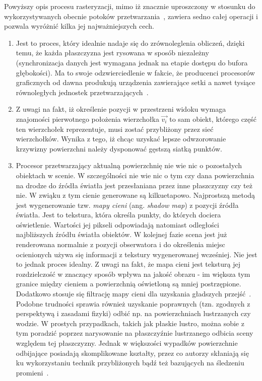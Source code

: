 Powyższy opis procesu rasteryzacji, mimo iż znacznie uproszczony w stosunku do wykorzystywanych obecnie potoków przetwarzania~\cite{OPENGL_SUPERBIBLE}, zawiera sedno całej operacji i pozwala wyróżnić kilka jej najważniejszych cech.
\begin{enumerate}
\item Jest to proces, który idealnie nadaje się do zrównoleglenia obliczeń, dzięki temu, że każda płaszczyzna jest rysowana w sposób niezależny (synchronizacja danych jest wymagana jednak na etapie dostępu do bufora głębokości). Ma to swoje odzwierciedlenie w fakcie, że producenci procesorów graficznych od dawna produkują urządzenia zawierające setki a nawet tysiące równoległych jednostek przetwarzających~\cite{NV_Hardware}\cite{AMD_Hardware}.
\item Z uwagi na fakt, iż określenie pozycji w przestrzeni widoku wymaga znajomości pierwotnego położenia wierzchołka $\vec{v_i}$ to sam obiekt, którego część ten wierzchołek reprezentuje, musi zostać przybliżony przez sieć wierzchołków. Wynika z tego, iż chcąc uzyskać lepsze odwzorowanie krzywizny powierzchni należy dysponować gęstszą siatką punktów.
\item Procesor przetwarzający aktualną powierzchnię nie wie nic o pozostałych obiektach w scenie. W szczególności nie wie nic o tym czy dana powierzchnia na drodze do źródła światła jest przesłaniana przez inne płaszczyzny czy też nie. W zwiąku z tym cienie generowane są kilkuetapowo. Najprostszą metodą jest wygenerowanie tzw. \textit{mapy cieni} (ang. \textit{shadow map}) z pozycji źródła światła. Jest to tekstura, która określa punkty, do których dociera oświetlenie. Wartości jej pikseli odpowiadają natomiast odległości najbliższych źródłu światła obiektów. W kolejnej fazie scena jest już renderowana normalnie z pozycji obserwatora i do określenia miejsc ocienionych używa się informacji z tekstury wygenerowanej wcześniej. Nie jest to jednak proces idealny. Z uwagi na fakt, że mapa cieni jest teksturą jej rozdzielczość w znaczący sposób wpływa na jakość obrazu - im większa tym granice między cieniem a powierzchnią oświetloną są mniej postrzępione. Dodatkowo stosuje się filtrację mapy cieni dla uzyskania gładszych przejść~\cite{GPU_GEMS3_PCF}. Podobne trudności sprawia również uzyskanie poprawnych (tzn. zgodnych z perspektywą i zasadami fizyki) odbić np. na powierzchniach lustrzanych czy wodzie. W prostych przypadkach, takich jak płaskie lustro, można sobie z tym poradzić poprzez narysowanie na płaszczyźnie lustrzanego odbicia sceny względem tej płaszczyzny. Jednak w większości wypadków powierzchnie odbijające posiadają skomplikowane kształty, przez co autorzy skłaniają się ku wykorzystaniu technik przybliżonych bądź też bazujących na śledzeniu promieni~\cite{GPU_GEMS3_MIRRORS}.
\end{enumerate}
